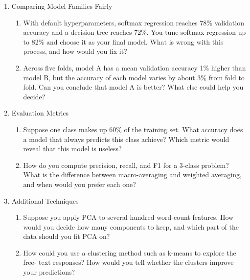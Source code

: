 \documentclass[12pt]{article}
\begin{document}
\begin{enumerate}
\begin{enumerate}
choose the range of values to try?
\item You try maximum depths from 2 to 10 for a decision tree, and the validation
accuracy is highest at a depth of 10. Is your search finished? What would you do
next?
\item After choosing your final model and its hyperparameters, should you retrain
it on the training and validation sets combined? What do you gain, and what do you
lose?
\end{enumerate}
\item Comparing Model Families Fairly
\begin{enumerate}
\item With default hyperparameters, softmax regression reaches 78\% validation
accuracy and a decision tree reaches 72\%. You tune softmax regression up to 82\%
and choose it as your final model. What is wrong with this process, and how would
you fix it?
\item Across five folds, model A has a mean validation accuracy 1\% higher than
model B, but the accuracy of each model varies by about 3\% from fold to fold. Can
you conclude that model A is better? What else could help you decide?
\end{enumerate}
\item Evaluation Metrics
\begin{enumerate}
\item Suppose one class makes up 60\% of the training set. What accuracy does a
model that always predicts this class achieve? Which metric would reveal that this
model is useless?
\item How do you compute precision, recall, and F1 for a 3-class problem? What is
the difference between macro-averaging and weighted averaging, and when would you
prefer each one?
\end{enumerate}
\item Additional Techniques
\begin{enumerate}
\item Suppose you apply PCA to several hundred word-count features. How would you
decide how many components to keep, and which part of the data should you fit PCA
on?
\item How could you use a clustering method such as k-means to explore the free-
text responses? How would you tell whether the clusters improve your predictions?
\end{enumerate}
\end{enumerate}
\end{document}
